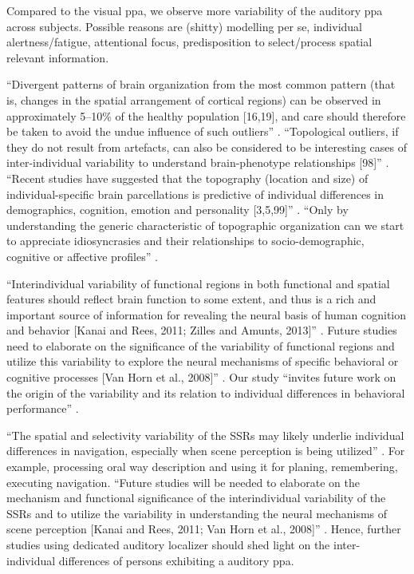 %
Compared to the visual \ac{ppa}, we observe more variability of the auditory
\ac{ppa} across subjects.
%
Possible reasons are (shitty) modelling per se, individual alertness/fatigue,
attentional focus, predisposition to select/process spatial relevant
information.

%
``Divergent patterns of brain organization from the most common pattern (that
is, changes in the spatial arrangement of cortical regions) can be observed in
approximately 5–10\% of the healthy population [16,19], and care should
therefore be taken to avoid the undue influence of such outliers''
\citep{eickhoff2018imaging}.
%
``Topological outliers, if they do not result from artefacts, can also be
considered to be interesting cases of inter-individual variability to understand
brain-phenotype relationships [98]'' \citep{eickhoff2018imaging}.
%
``Recent studies have suggested that the topography (location and size)
of individual-specific brain parcellations is predictive of individual
differences in demographics, cognition, emotion and personality [3,5,99]''
\citep{eickhoff2018imaging}.
%
``Only by understanding the generic characteristic of topographic organization
can we start to appreciate idiosyncrasies and their relationships to
socio-demographic, cognitive or affective profiles''
\citep{eickhoff2018imaging}.


%
``Interindividual variability of functional regions in both functional and
spatial features should reflect brain function to some extent, and thus is a
rich and important source of information for revealing the neural basis of human
cognition and behavior [Kanai and Rees, 2011; Zilles and Amunts, 2013]''
\citep{zhen2015quantifying}.
%
Future studies need to elaborate on the significance of the variability of
functional regions and utilize this variability to explore the neural mechanisms
of specific behavioral or cognitive processes [Van Horn et al., 2008]''
\citep{zhen2015quantifying}.
%
Our study ``invites future work on the origin of the variability and its
relation to individual differences in behavioral performance''
\citep{zhen2015quantifying}.


``The spatial and selectivity variability of the SSRs may likely underlie
individual differences in navigation, especially when scene perception is being
utilized'' \citep{zhen2017quantifying}.
%
For example, processing oral way description and using it for planing,
remembering, executing navigation.
%
``Future studies will be needed to elaborate on the mechanism and functional
significance of the interindividual variability of the SSRs and to utilize the
variability in understanding the neural mechanisms of scene perception [Kanai
and Rees, 2011; Van Horn et al., 2008]'' \citep{zhen2017quantifying}.
%
Hence, further studies using dedicated auditory localizer should shed light on
the inter-individual differences of persons exhibiting a auditory \ac{ppa}.


